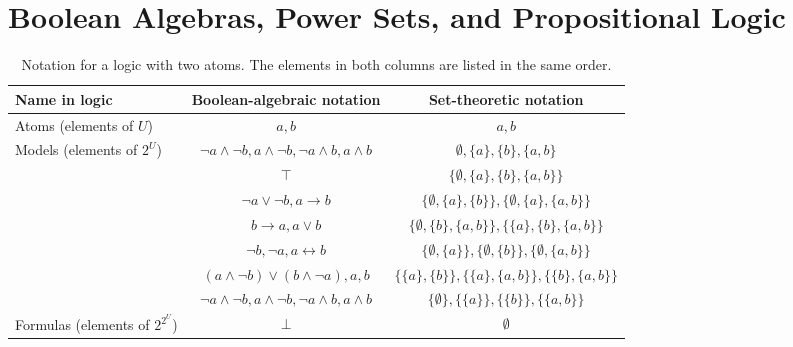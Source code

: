 \documentclass{uai2021} %
\theoremstyle{definition}
\begin{document}
\section{Boolean Algebras, Power Sets, and Propositional
  Logic} \label{sec:prelims}

\begin{table*}
  \caption{Notation for a logic with two atoms. The elements in both columns are
    listed in the same order.}
  \label{tbl:notation_example}
  \centering
  \begin{tabular}{lcc}
    \toprule
    Name in logic & Boolean-algebraic notation & Set-theoretic notation \\
    \midrule
    Atoms (elements of $U$) & $a, b$ & $a, b$ \\
    \rowcolor{gray!10} Models (elements of $2^U$) & $\neg a \land \neg b, a \land \neg b, \neg a \land b, a \land b$ & $\emptyset, \{a\}, \{b\}, \{a, b\}$ \\
    & $\top$ & $\{ \emptyset, \{a\}, \{b\}, \{a, b\} \}$ \\
    & $\neg a \lor \neg b, a \to b$ & $\{ \emptyset, \{a\}, \{b\} \}, \{ \emptyset, \{a\}, \{a, b\} \}$ \\
    & $b \to a, a \lor b$ & $\{ \emptyset, \{b\}, \{a, b\} \}, \{ \{a\}, \{b\}, \{a, b\} \}$ \\
    & $\neg b, \neg a, a \leftrightarrow b$ & $\{\emptyset, \{a\}\}, \{\emptyset, \{b\}\}, \{\emptyset, \{a, b\}\}$ \\
    & $(a \land \neg b) \lor (b \land \neg a), a, b$ & $\{\{a\}, \{b\}\}, \{\{a\}, \{a, b\}\}, \{\{b\}, \{a, b\}\}$ \\
    & $\neg a \land \neg b, a \land \neg b, \neg a \land b, a \land b$ & $\{\emptyset\}, \{\{a\}\}, \{\{b\}\}, \{\{a, b\}\}$ \\
    \multirow{-7}{*}{Formulas (elements of $2^{2^U}$)} & $\bot$ & $\emptyset$ \\
    \bottomrule
  \end{tabular}
\end{table*}
\end{document}
